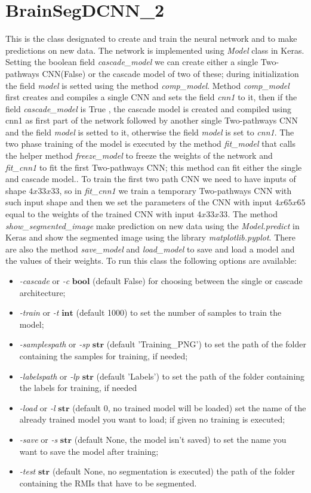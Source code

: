 \documentclass[openany,12pt,english]{book}
\begin{document}
	\section{BrainSegDCNN\_2}
	This is the class designated to create and train the neural network and to make predictions on new data. The network is implemented using \emph{Model} class in Keras.
	Setting the boolean field \emph{cascade\_model} we can create either a single Two-pathways CNN(False) or the cascade model of two of these; during initialization the field \emph{model} is setted using the method \emph{comp\_model}.
	Method \emph{comp\_model} first creates and compiles a single CNN and sets the field \emph{cnn1} to it, then if the field \emph{cascade\_model} is True , the cascade model is created and compiled using cnn1 as first part of the network followed by another single Two-pathways CNN and the field \emph{model} is setted to it, otherwise the field \emph{model} is set to \emph{cnn1}.
	The two phase training of the model is executed by the method \emph{fit\_model} that calls the helper method \emph{freeze\_model} to freeze the weights of the network and \emph{fit\_cnn1} to fit the first Two-pathways CNN; this method can fit either the single and cascade model.. To train the first two path CNN we need to have inputs of shape $4x33x33$, so in \emph{fit\_cnn1} we train a temporary Two-pathways CNN with such input shape and then we set the parameters of the CNN with input $4x65x65$ equal to the weights of the trained CNN with input $4x33x33$.
	The method \emph{show\_segmented\_image} make prediction on new data using the \emph{Model.predict} in Keras and show the segmented image using the library \emph{matplotlib.pyplot}.
	There are also the method \emph{save\_model} and \emph{load\_model} to save and load a model and the values of their weights. 
	To run this class the following options are available:
	\begin{itemize}
		\item \emph{-cascade} or \emph{-c} $\mathbf{bool}$ (default False) for choosing between the single or cascade architecture;
		\item \emph{-train} or \emph{-t} $\mathbf{int}$ (default 1000) to set the number of samples to train the model;
		\item \emph{-samplespath} or \emph{-sp} $\mathbf{str}$ (default 'Training\_PNG') to set the path of the folder containing the samples for training, if needed;
		\item \emph{-labelspath} or \emph{-lp} $\mathbf{str}$ (default 'Labels') to set the path of the folder containing the labels for training, if needed
		\item \emph{-load} or \emph{-l} $\mathbf{str}$ (default 0, no trained model will be loaded) set the name of the already trained model you want to load; if given no training is executed;
		\item \emph{-save} or \emph{-s} $\mathbf{str}$ (default None, the model isn't saved) to set the name you want to save the model after training;
		\item \emph{-test} $\mathbf{str}$ (default None, no segmentation is executed) the path of the folder containing the RMIs that have to be segmented.
	\end{itemize}
	
	
	\clearpage


\end{document}
